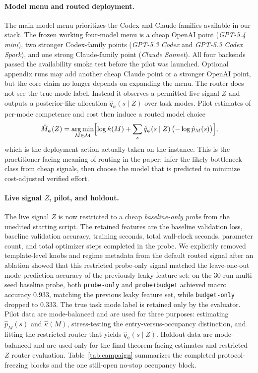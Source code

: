 \documentclass{article}
\DeclareMathOperator*{\argmin}{arg\,min}
\begin{document}
\paragraph{Model menu and routed deployment.}
The main model menu prioritizes the Codex and Claude families available in our stack.
The frozen working four-model menu is a cheap OpenAI point (\textit{GPT-5.4 mini}), two stronger Codex-family points (\textit{GPT-5.3 Codex} and \textit{GPT-5.3 Codex Spark}), and one strong Claude-family point (\textit{Claude Sonnet}).
All four backends passed the availability smoke test before the pilot was launched.
Optional appendix runs may add another cheap Claude point or a stronger OpenAI point, but the core claim no longer depends on expanding the menu.
The router does not see the true mode label.
Instead it observes a permitted live signal $Z$ and outputs a posterior-like allocation $\hat q_\psi(s\mid Z)$ over task modes.
Pilot estimates of per-mode competence and cost then induce a routed model choice
\[
  \hat M_\psi(Z)
  =
  \argmin_{M\in\mathcal M}
  \Bigl[
    \log \hat\kappa(M)
    +
    \sum_s \hat q_\psi(s\mid Z)\,\bigl(-\log \hat p_M(s)\bigr)
  \Bigr],
\]
which is the deployment action actually taken on the instance.
This is the practitioner-facing meaning of routing in the paper: infer the likely bottleneck class from cheap signals, then choose the model that is predicted to minimize cost-adjusted verified effort.

\paragraph{Live signal $Z$, pilot, and holdout.}
The live signal $Z$ is now restricted to a cheap \emph{baseline-only probe} from the unedited starting script.
The retained features are the baseline validation loss, baseline validation accuracy, training seconds, total wall-clock seconds, parameter count, and total optimizer steps completed in the probe.
We explicitly removed template-level knobs and regime metadata from the default routed signal after an ablation showed that this restricted probe-only signal matched the leave-one-out mode-prediction accuracy of the previously leaky feature set: on the 30-run multi-seed baseline probe, both \texttt{probe-only} and \texttt{probe+budget} achieved macro accuracy $0.933$, matching the previous leaky feature set, while \texttt{budget-only} dropped to $0.333$.
The true task mode label is retained only by the evaluator.
Pilot data are mode-balanced and are used for three purposes: estimating $\hat p_M(s)$ and $\hat\kappa(M)$, stress-testing the entry-versus-occupancy distinction, and fitting the restricted router that yields $\hat q_\psi(s\mid Z)$.
Holdout data are mode-balanced and are used only for the final theorem-facing estimates and restricted-$Z$ router evaluation.
Table~\ref{tab:campaign} summarizes the completed protocol-freezing blocks and the one still-open no-stop occupancy block.
\end{document}
